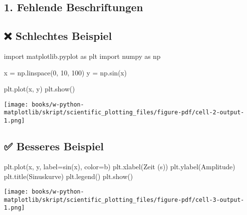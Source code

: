 \documentclass[
  letterpaper,
  DIV=11,
  numbers=noendperiod]{scrreprt}
\newenvironment{Shaded}{\begin{snugshade}}{\end{snugshade}}
\newcommand{\DecValTok}[1]{\textcolor[rgb]{0.68,0.00,0.00}{#1}}
\newcommand{\ImportTok}[1]{\textcolor[rgb]{0.00,0.46,0.62}{#1}}
\newcommand{\NormalTok}[1]{\textcolor[rgb]{0.00,0.23,0.31}{#1}}
\newcommand{\OperatorTok}[1]{\textcolor[rgb]{0.37,0.37,0.37}{#1}}
\newcommand{\StringTok}[1]{\textcolor[rgb]{0.13,0.47,0.30}{#1}}
\begin{document}
\begin{tcolorbox}
\section{1. Fehlende Beschriftungen}\label{fehlende-beschriftungen}

\subsection{❌ Schlechtes Beispiel}\label{schlechtes-beispiel}

\begin{Shaded}
\begin{Highlighting}[]
\ImportTok{import}\NormalTok{ matplotlib.pyplot }\ImportTok{as}\NormalTok{ plt}
\ImportTok{import}\NormalTok{ numpy }\ImportTok{as}\NormalTok{ np}

\NormalTok{x }\OperatorTok{=}\NormalTok{ np.linspace(}\DecValTok{0}\NormalTok{, }\DecValTok{10}\NormalTok{, }\DecValTok{100}\NormalTok{)}
\NormalTok{y }\OperatorTok{=}\NormalTok{ np.sin(x)}

\NormalTok{plt.plot(x, y)}
\NormalTok{plt.show()}
\end{Highlighting}
\end{Shaded}

\texttt{[image: books/w-python-matplotlib/skript/scientific\_plotting\_files/figure-pdf/cell-2-output-1.png]}

\subsection{✅ Besseres Beispiel}\label{besseres-beispiel}

\begin{Shaded}
\begin{Highlighting}[]
\NormalTok{plt.plot(x, y, label}\OperatorTok{=}\StringTok{\textquotesingle{}sin(x)\textquotesingle{}}\NormalTok{, color}\OperatorTok{=}\StringTok{\textquotesingle{}b\textquotesingle{}}\NormalTok{)}
\NormalTok{plt.xlabel(}\StringTok{\textquotesingle{}Zeit (s)\textquotesingle{}}\NormalTok{)}
\NormalTok{plt.ylabel(}\StringTok{\textquotesingle{}Amplitude\textquotesingle{}}\NormalTok{)}
\NormalTok{plt.title(}\StringTok{\textquotesingle{}Sinuskurve\textquotesingle{}}\NormalTok{)}
\NormalTok{plt.legend()}
\NormalTok{plt.show()}
\end{Highlighting}
\end{Shaded}

\texttt{[image: books/w-python-matplotlib/skript/scientific\_plotting\_files/figure-pdf/cell-3-output-1.png]}


\end{tcolorbox}
\end{document}
